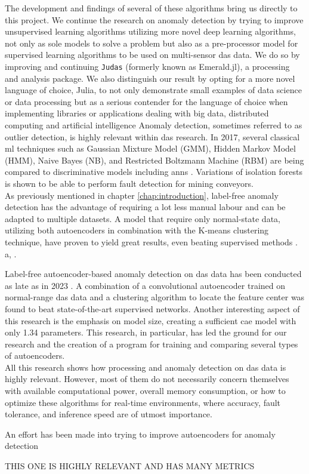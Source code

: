 The development and findings of several of these algorithms bring us directly to this project. We continue the research on anomaly detection by trying to improve unsupervised learning algorithms utilizing more novel deep learning algorithms, not only as sole models to solve a problem but also as a pre-processor model for supervised learning algorithms to be used on multi-sensor das data. We do so by improving and continuing \texttt{Judas} (formerly known as Emerald.jl), a processing and analysis package. We also distinguish our result by opting for a more novel language of choice, Julia, to not only demonstrate small examples of data science or data processing but as a serious contender for the language of choice when implementing libraries or applications dealing with big data, distributed computing and artificial intelligence
Anomaly detection, sometimes referred to as outlier detection, is highly relevant within \acrshort{das} research. In 2017, several classical \acrshort{ml} techniques such as Gaussian Mixture Model (GMM), Hidden Markov Model (HMM), Naive Bayes (NB), and Restricted Boltzmann Machine (RBM) are being compared to discriminative models including \acrshort{ann}s \cite{app7080841}. Variations of isolation forests is shown to be able to perform fault detection for mining conveyors\cite{WIJAYA2022110330}. \\

As previously mentioned in chapter \ref{chap:introduction}, label-free anomaly detection has the advantage of requiring a lot less manual labour and can be adapted to multiple datasets. A model that require only normal-state data, utilizing both autoencoders in combination with the K-means clustering technique, have proven to yield great results, even beating supervised methods \cite{s23084094}. \\ 

a, \cite{10.14778/3538598.3538602} \cite{10.1145/3444690}.

Label-free autoencoder-based anomaly detection on \acrshort{das} data has been conducted as late as in 2023 \cite{xie2023label}. A combination of a convolutional autoencoder trained on normal-range \acrshort{das} data and a clustering algorithm to locate the feature center was found to beat state-of-the-art supervised networks. Another interesting aspect of this research is the emphasis on model size, creating a sufficient \acrshort{cae} model with only \qty{1.34}{\si{\kilo}} parameters. This research, in particular, has led the ground for our research and the creation of a program for training and comparing several types of autoencoders. \\

All this research shows how processing and anomaly detection on \acrshort{das} data is highly relevant. However, most of them do not necessarily concern themselves with available computational power, overall memory consumption, or how to optimize these algorithms for real-time environments, where accuracy, fault tolerance, and inference speed are of utmost importance.

An effort has been made into trying to improve autoencoders for anomaly detection \cite{tan2023improving}

THIS ONE IS HIGHLY RELEVANT AND HAS MANY METRICS \cite{s23021009}
